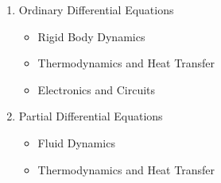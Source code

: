 \documentclass[11pt]{article}
\begin{document}
\begin{itemize}
\begin{enumerate}
\begin{multicols}{2}
\begin{itemize}
				\end{itemize}
				\end{multicols}
			\item Ordinary Differential Equations \vspace{5mm}\\
				\begin{multicols}{2}
				\begin{itemize}
					\item Rigid Body Dynamics\\
					\item Thermodynamics and Heat Transfer\\
					\item Electronics and Circuits\\
				\end{itemize}
				\end{multicols}
			\item Partial Differential Equations \vspace{5mm}\\
				\begin{itemize}
					\item Fluid Dynamics\\
					\item Thermodynamics and Heat Transfer\\
				\end{itemize}
		\end{enumerate}
	\end{itemize}
	\LARGE
\end{document}
